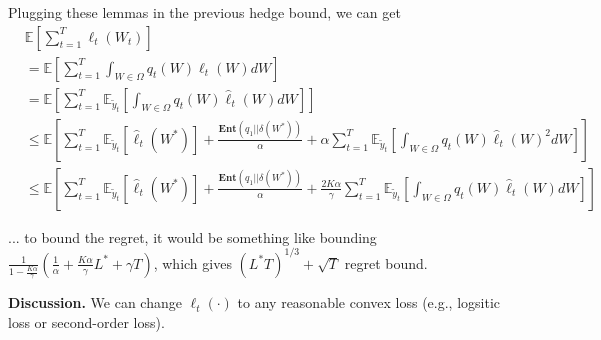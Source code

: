 \documentclass{article}
\newcommand{\field}[1]{\mathbb{#1}}
\newcommand{\E}{\field{E}}
\begin{document}
Plugging these lemmas in the previous hedge bound, we can get \begin{align*}
&\E\left[\sum_{t=1}^T  \ell_{t}(W_{t})  \right]\\
&=\E\left[\sum_{t=1}^T  \int_{W\in\Omega} q_t(W)\ell_t(W)dW  \right] \\
&=\E\left[\sum_{t=1}^T \E_{\tilde{y}_t} \left[ \int_{W\in\Omega} q_t(W)\hat{\ell}_t(W)dW \right] \right]\\
&\leq \E\left[\sum_{t=1}^T \E_{\tilde{y}_t} \left[ \hat{\ell}_t(W^*) \right]+ \frac{\textbf{Ent}(q_1||\delta(W^*))}{\alpha} + \alpha \sum_{t=1}^T \E_{\tilde{y}_t}\left[ \int_{W\in\Omega} q_t(W)\hat{\ell}_t(W)^2dW \right] \right] \\ 
&\leq \E\left[\sum_{t=1}^T \E_{\tilde{y}_t}\left[ \hat{\ell}_t(W^*) \right] + \frac{\textbf{Ent}(q_1||\delta(W^*))}{\alpha} + \frac{2K\alpha}{\gamma} \sum_{t=1}^T \E_{\tilde{y}_t}\left[ \int_{W\in\Omega} q_t(W)\hat{\ell}_t(W)dW \right]\right]
\end{align*}

... to bound the regret, it would be something like bounding $\frac{1}{1-\frac{K\alpha}{\gamma}}\left(\frac{1}{\alpha}+\frac{K\alpha}{\gamma}L^* + \gamma T\right)$, which gives $(L^*T)^{1/3} + \sqrt{T}$ regret bound. 


\textbf{Discussion.} We can change $\ell_t(\cdot)$ to any reasonable convex loss (e.g., logsitic loss or second-order loss). 





\newpage
 

\end{document}
